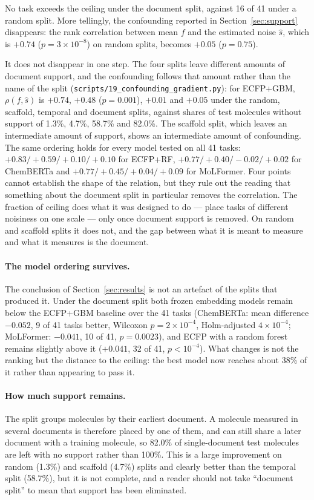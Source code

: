 No task exceeds the ceiling under the document split, against 16 of 41 under a random split. More tellingly, the confounding reported in Section~\ref{sec:support} disappears: the rank correlation between mean $f$ and the estimated noise $\hat s$, which is $+0.74$ ($p=3\times10^{-8}$) on random splits, becomes $+0.05$ ($p=0.75$).

It does not disappear in one step. The four splits leave different amounts of document support, and the confounding follows that amount rather than the name of the split (\texttt{scripts/}\allowbreak\texttt{19\_confounding\_gradient.py}): for ECFP+GBM, $\rho(f,\hat s)$ is $+0.74$, $+0.48$ ($p=0.001$), $+0.01$ and $+0.05$ under the random, scaffold, temporal and document splits, against shares of test molecules without support of 1.3\%, 4.7\%, 58.7\% and 82.0\%. The scaffold split, which leaves an intermediate amount of support, shows an intermediate amount of confounding. The same ordering holds for every model tested on all 41 tasks: $+0.83/+0.59/+0.10/+0.10$ for ECFP+RF, $+0.77/+0.40/-0.02/+0.02$ for ChemBERTa and $+0.77/+0.45/+0.04/+0.09$ for MoLFormer. Four points cannot establish the shape of the relation, but they rule out the reading that something about the document split in particular removes the correlation. The fraction of ceiling does what it was designed to do --- place tasks of different noisiness on one scale --- only once document support is removed. On random and scaffold splits it does not, and the gap between what it is meant to measure and what it measures is the document.

\paragraph{The model ordering survives.} The conclusion of Section~\ref{sec:results} is not an artefact of the splits that produced it. Under the document split both frozen embedding models remain below the ECFP+GBM baseline over the 41 tasks (ChemBERTa: mean difference $-0.052$, 9 of 41 tasks better, Wilcoxon $p=2\times10^{-4}$, Holm-adjusted $4\times10^{-4}$; MoLFormer: $-0.041$, 10 of 41, $p=0.0023$), and ECFP with a random forest remains slightly above it ($+0.041$, 32 of 41, $p<10^{-4}$). What changes is not the ranking but the distance to the ceiling: the best model now reaches about 38\% of it rather than appearing to pass it.

\paragraph{How much support remains.} The split groups molecules by their earliest document. A molecule measured in several documents is therefore placed by one of them, and can still share a later document with a training molecule, so 82.0\% of single-document test molecules are left with no support rather than 100\%. This is a large improvement on random (1.3\%) and scaffold (4.7\%) splits and clearly better than the temporal split (58.7\%), but it is not complete, and a reader should not take ``document split'' to mean that support has been eliminated.

